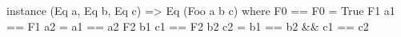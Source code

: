 \begin{code}
instance (Eq a, Eq b, Eq c)
      => Eq (Foo a b c) where
  F0       == F0       = True
  F1 a1    == F1 a2    = a1 == a2
  F2 b1 c1 == F2 b2 c2 = b1 == b2 && c1 == c2
\end{code}
